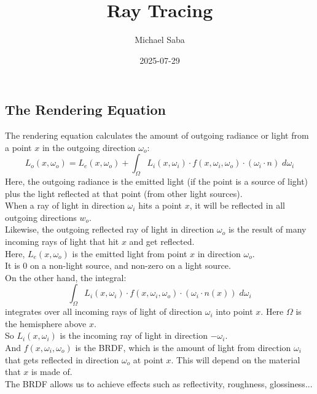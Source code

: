 \documentclass[12pt]{article}
\title{%
    \Huge Ray Tracing
}
\date{2025-07-29}
\author{Michael Saba}
\begin{document}
\maketitle
\newpage
\setlength{\parindent}{0pt}

\newpage

\subsection*{The Rendering Equation}

The rendering equation calculates the amount of
outgoing radiance or light from a point $x$
in the outgoing direction $\omega_o$:
\[ L_{o}(x, \omega_o)
= L_{e}(x, \omega_o)
+ \int_\Omega L_{i}(x, \omega_i) \cdot
f(x, \omega_i, \omega_o) \cdot
(\omega_i \cdot n) \; d\omega_i \]
Here, the outgoing radiance is the emitted light
(if the point is a source of light)
plus the light reflected at that point (from other
light sources). \\

When a ray of light in direction $\omega_i$
hits a point $x$, it will be reflected in all 
outgoing directions $w_o$. \\
Likewise, the outgoing reflected ray of light in
direction $\omega_o$ is the result of many incoming
rays of light that hit $x$ and get reflected. \\

Here, $L_{e}(x, \omega_o)$ is the emitted light 
from point $x$ in direction $\omega_o$. \\
It is $0$ on a non-light source, and non-zero
on a light source. \\
 
On the other hand, the integral:
\[ \int_\Omega L_{i}(x, \omega_i) \cdot
f(x, \omega_i, \omega_o) \cdot
(\omega_i \cdot n(x)) \; d\omega_i \]
integrates over all incoming rays of light
of direction $\omega_i$ into point $x$.
Here $\Omega$ is the hemisphere above $x$. \\

So $L_{i}(x, \omega_i)$ is the incoming ray
of light in direction $-\omega_i$. \\

And $f(x, \omega_i, \omega_o)$ is the BRDF, 
which is the amount of light from direction $\omega_i$
that gets reflected in direction $\omega_o$
at point $x$.
This will depend on the material that $x$ is made of. \\
The BRDF allows us to achieve effects such as reflectivity,
roughness, glossiness... \\ 
\end{document}
